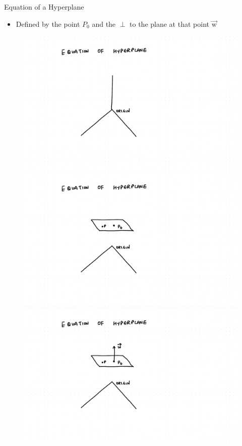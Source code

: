 \documentclass{beamer}
\begin{document}
\begin{frame}{Equation of a Hyperplane}

\begin{itemize}
	\item Defined by the point $P_{0}$ and the $\perp$ to the plane at that point $\overrightarrow{\text{w}}$
\end{itemize}

\begin{figure}
\begin{overprint}
 \includegraphics[scale=0.3]{./SVM/Svm-12.pdf}
 \includegraphics[scale=0.3]{./SVM/Svm-13.pdf}
 \includegraphics[scale=0.3]{./SVM/Svm-14.pdf}

\end{overprint}
\end{figure}
\end{frame}
\end{document}
